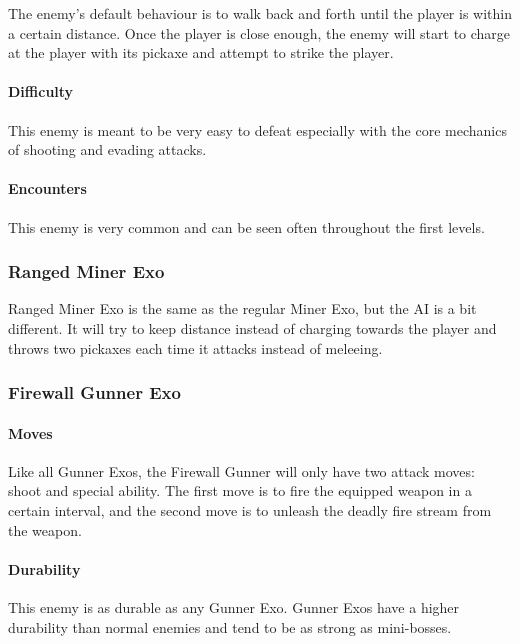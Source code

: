 \documentclass[12pt]{article}
\begin{document}
The enemy's default behaviour is to walk back and forth until the player is within a certain distance. Once the player is close enough, the enemy will start to charge at the player with its pickaxe and attempt to strike the player.

\paragraph{Difficulty}

This enemy is meant to be very easy to defeat especially with the core mechanics of shooting and evading attacks. 

\paragraph{Encounters}

This enemy is very common and can be seen often throughout the first levels.

\subsubsection{Ranged Miner Exo}

Ranged Miner Exo is the same as the regular Miner Exo, but the AI is a bit different. It will try to keep distance instead of charging towards the player and throws two pickaxes each time it attacks instead of meleeing. 

\subsubsection{Firewall Gunner Exo}

\paragraph{Moves}

Like all Gunner Exos, the Firewall Gunner will only have two attack moves: shoot and special ability. The first move is to fire the equipped weapon in a certain interval, and the second move is to unleash the deadly fire stream from the weapon.

\paragraph{Durability}

This enemy is as durable as any Gunner Exo. Gunner Exos have a higher durability than normal enemies and tend to be as strong as mini-bosses. 
\end{document}
